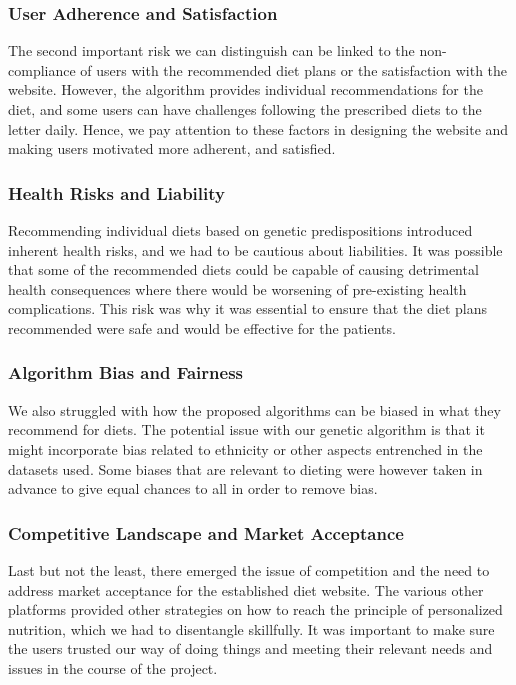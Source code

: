 \documentclass[a4paper,12pt]{article}
\begin{document}
\subsubsection{User Adherence and Satisfaction}
The second important risk we can distinguish can be linked to the non-compliance of users with the recommended diet plans or the satisfaction with the website. However, the algorithm provides individual recommendations for the diet, and some users can have challenges following the prescribed diets to the letter daily. Hence, we pay attention to these factors in designing the website and making users motivated more adherent, and satisfied.

\subsubsection{Health Risks and Liability}
Recommending individual diets based on genetic predispositions introduced inherent health risks, and we had to be cautious about liabilities. It was possible that some of the recommended diets could be capable of causing detrimental health consequences where there would be worsening of pre-existing health complications. This risk was why it was essential to ensure that the diet plans recommended were safe and would be effective for the patients.

\subsubsection{Algorithm Bias and Fairness}
We also struggled with how the proposed algorithms can be biased in what they recommend for diets. The potential issue with our genetic algorithm is that it might incorporate bias related to ethnicity or other aspects entrenched in the datasets used. Some biases that are relevant to dieting were however taken in advance to give equal chances to all in order to remove bias.

\subsubsection{Competitive Landscape and Market Acceptance}
Last but not the least, there emerged the issue of competition and the need to address market acceptance for the established diet website. The various other platforms provided other strategies on how to reach the principle of personalized nutrition, which we had to disentangle skillfully. It was important to make sure the users trusted our way of doing things and meeting their relevant needs and issues in the course of the project.
\end{document}
